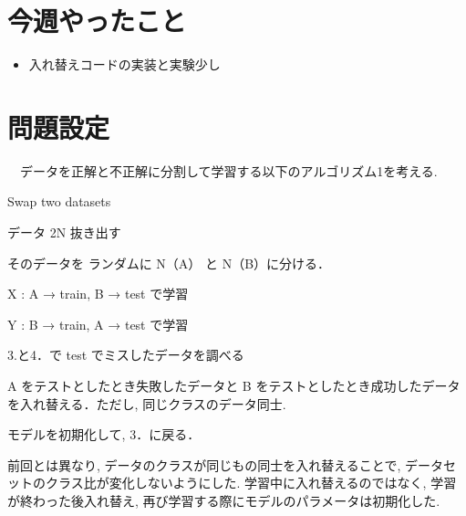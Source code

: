 \documentclass[twocolumn]{jarticle}     %
\begin{document}


\section{今週やったこと}
\begin{itemize}
	\item {入れ替えコードの実装と実験少し}
\end{itemize}

\section{問題設定}

　データを正解と不正解に分割して学習する以下のアルゴリズム1を考える.

	\begin{algorithm}
		\caption{Swap two datasets}
		\label{alg1}
		\begin{enumerate}{ %
			\item{データ 2N 抜き出す}
			\item{そのデータを ランダムに N（A） と N（B）に分ける．}
			\item{X : A → train, B → test で学習}
			\item{Y : B → train, A → test で学習}
			\item{3.と4．で test でミスしたデータを調べる}
			\item{A をテストとしたとき失敗したデータと B をテストとしたとき成功したデータを入れ替える．ただし, 同じクラスのデータ同士.}
			\item{モデルを初期化して, 3．に戻る．}
		}\end{enumerate}
	\end{algorithm}

	前回とは異なり, データのクラスが同じもの同士を入れ替えることで, データセットのクラス比が変化しないようにした.
  学習中に入れ替えるのではなく, 学習が終わった後入れ替え, 再び学習する際にモデルのパラメータは初期化した.
\end{document}
